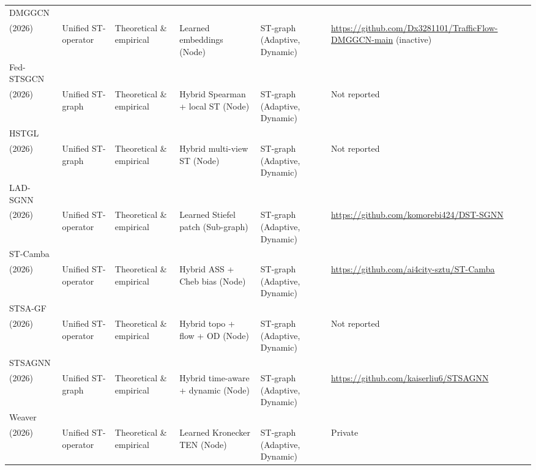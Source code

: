 \begin{longtable}{p{1.5cm} p{1.5cm} p{1.5cm} p{2cm} p{1.5cm} p{2.5cm}}
\hline
DMGGCN\\(2026) ~\cite{deng2026dynamic}&
Unified ST-operator &
Theoretical \& empirical &
Learned embeddings (Node) &
ST-graph (Adaptive, Dynamic) &
\url{https://github.com/Dx3281101/TrafficFlow-DMGGCN-main} (inactive)
\\
\hline
Fed-STSGCN\\(2026) ~\cite{yu2026federated}&
Unified ST-graph &
Theoretical \& empirical &
Hybrid Spearman + local ST (Node) &
ST-graph (Adaptive, Dynamic) &
Not reported
\\
\hline
HSTGL\\(2026) ~\cite{sun2026integrating}&
Unified ST-graph &
Theoretical \& empirical &
Hybrid multi-view ST (Node) &
ST-graph (Adaptive, Dynamic) &
Not reported
\\
\hline
LAD-SGNN\\(2026) ~\cite{zheng2026llm}&
Unified ST-operator &
Theoretical \& empirical &
Learned Stiefel patch (Sub-graph) &
ST-graph (Adaptive, Dynamic) &
\url{https://github.com/komorebi424/DST-SGNN}
\\
\hline
ST-Camba\\(2026) ~\cite{wang2026st}&
Unified ST-operator &
Theoretical \& empirical &
Hybrid ASS + Cheb bias (Node) &
ST-graph (Adaptive, Dynamic) &
\url{https://github.com/ai4city-sztu/ST-Camba}
\\
\hline
STSA-GF\\(2026) ~\cite{yang2026short}&
Unified ST-operator &
Theoretical \& empirical &
Hybrid topo + flow + OD (Node) &
ST-graph (Adaptive, Dynamic) &
Not reported
\\
\hline
STSAGNN\\(2026) ~\cite{liu2026spatio}&
Unified ST-graph &
Theoretical \& empirical &
Hybrid time-aware + dynamic (Node) &
ST-graph (Adaptive, Dynamic) &
\url{https://github.com/kaiserliu6/STSAGNN}
\\
\hline
Weaver\\(2026) ~\cite{cheong2026weaver}& 
Unified ST-operator &
Theoretical \& empirical &
Learned Kronecker TEN (Node) &
ST-graph (Adaptive, Dynamic) &
Private 
\\
\hline
\end{longtable}
\endgroup